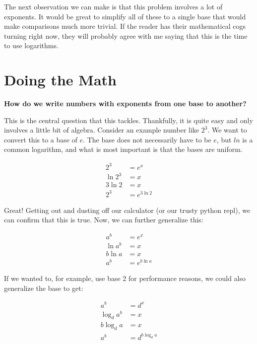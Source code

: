 \documentclass[13pt]{article}
\begin{document}
The next observation we can make is that this problem involves a lot of exponents. It would be great to simplify all of these to a single base that would make comparisons much more trivial. If the reader has their mathematical cogs turning right now, they will probably agree with me saying that this is the time to use logarithms.

\section{Doing the Math}

\textbf{How do we write numbers with exponents from one base to another?}

This is the central question that this tackles. Thankfully, it is quite easy and only involves a little bit of algebra. Consider an example number like $2^3$. We want to convert this to a base of $e$. The base does not necessarily have to be $e$, but $ln$ is a common logarithm, and what is most important is that the bases are uniform.

\begin{equation}
\begin{split}
2^3 &= e^x \\
\ln{2^3} &= x \\
3 \ln{2} &= x \\
2^3 &= e^{3 \ln{2}}
\end{split}
\end{equation}

Great! Getting out and dusting off our calculator (or our trusty python repl), we can confirm that this is true. Now, we can further generalize this:

\begin{equation}
\begin{split}
a^b &= e^x \\
\ln{a^b} &= x \\
b \ln{a} &= x \\
a^b &= e^{b \ln{a}}
\end{split}
\end{equation}

If we wanted to, for example, use base 2 for performance reasons, we could also generalize the base to get:

\begin{equation}
\begin{split}
a^b &= d^x \\
\log_d{a^b} &= x \\
b \log_d{a} &= x \\
a^b &= d^{b \log_d{a}}
\end{split}
\end{equation}
\end{document}
